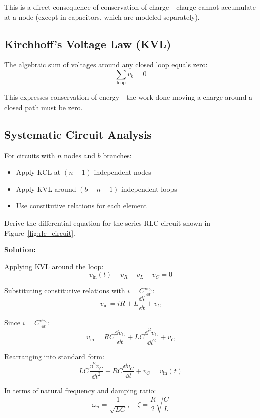 This is a direct consequence of conservation of charge---charge cannot accumulate at a node (except in capacitors, which are modeled separately).

\subsection{Kirchhoff's Voltage Law (KVL)}

The algebraic sum of voltages around any closed loop equals zero:
\begin{equation}
\sum_{\text{loop}} v_k = 0
\label{eq:kvl}
\end{equation}

This expresses conservation of energy---the work done moving a charge around a closed path must be zero.

\subsection{Systematic Circuit Analysis}

For circuits with $n$ nodes and $b$ branches:
\begin{itemize}
    \item Apply KCL at $(n-1)$ independent nodes
    \item Apply KVL around $(b-n+1)$ independent loops
    \item Use constitutive relations for each element
\end{itemize}



\begin{examplebox}[title=Example 3.3: RLC Circuit Analysis]
Derive the differential equation for the series RLC circuit shown in Figure~\ref{fig:rlc_circuit}.

\textbf{Solution:}

Applying KVL around the loop:
\begin{equation*}
v_{\text{in}}(t) - v_R - v_L - v_C = 0
\end{equation*}

Substituting constitutive relations with $i = C\frac{\dd v_C}{\dd t}$:
\begin{equation*}
v_{\text{in}} = iR + L\frac{\dd i}{\dd t} + v_C
\end{equation*}

Since $i = C\frac{\dd v_C}{\dd t}$:
\begin{equation*}
v_{\text{in}} = RC\frac{\dd v_C}{\dd t} + LC\frac{\dd^2 v_C}{\dd t^2} + v_C
\end{equation*}

Rearranging into standard form:
\begin{equation*}
\boxed{LC\frac{\dd^2 v_C}{\dd t^2} + RC\frac{\dd v_C}{\dd t} + v_C = v_{\text{in}}(t)}
\end{equation*}

In terms of natural frequency and damping ratio:
\begin{equation*}
\omega_n = \frac{1}{\sqrt{LC}}, \quad \zeta = \frac{R}{2}\sqrt{\frac{C}{L}}
\end{equation*}
\end{examplebox}

